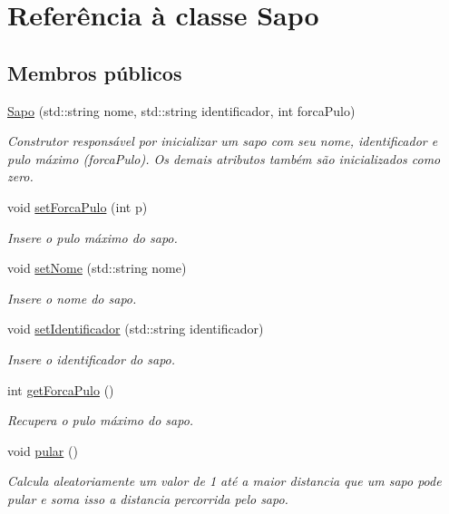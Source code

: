 \hypertarget{classSapo}{}\section{Referência à classe Sapo}
\label{classSapo}
\subsection*{Membros públicos}
\begin{DoxyCompactItemize}
\item 
\hyperlink{classSapo_a402f1c5435dd13180835b3b847e4bd7c}{Sapo} (std\+::string nome, std\+::string identificador, int forca\+Pulo)
\begin{DoxyCompactList}\small\item\em Construtor responsável por inicializar um sapo com seu nome, identificador e pulo máximo (forca\+Pulo). Os demais atributos também são inicializados como zero. \end{DoxyCompactList}\item 
void \hyperlink{classSapo_ab43f2991360d34d24f73d4cf0e7e9ea6}{set\+Forca\+Pulo} (int p)
\begin{DoxyCompactList}\small\item\em Insere o pulo máximo do sapo. \end{DoxyCompactList}\item 
void \hyperlink{classSapo_aacafe6399f877e9bda12c146531fe31f}{set\+Nome} (std\+::string nome)
\begin{DoxyCompactList}\small\item\em Insere o nome do sapo. \end{DoxyCompactList}\item 
void \hyperlink{classSapo_a617cde091fd409e66caacee5bf079e05}{set\+Identificador} (std\+::string identificador)
\begin{DoxyCompactList}\small\item\em Insere o identificador do sapo. \end{DoxyCompactList}\item 
int \hyperlink{classSapo_ac6225c3632a30877068c9b2bc50e6ed1}{get\+Forca\+Pulo} ()
\begin{DoxyCompactList}\small\item\em Recupera o pulo máximo do sapo. \end{DoxyCompactList}\item 
void \hyperlink{classSapo_a32e61c61677967120ae652099bd56805}{pular} ()
\begin{DoxyCompactList}\small\item\em Calcula aleatoriamente um valor de 1 até a maior distancia que um sapo pode pular e soma isso a distancia percorrida pelo sapo. \end{DoxyCompactList}\end{DoxyCompactItemize}
